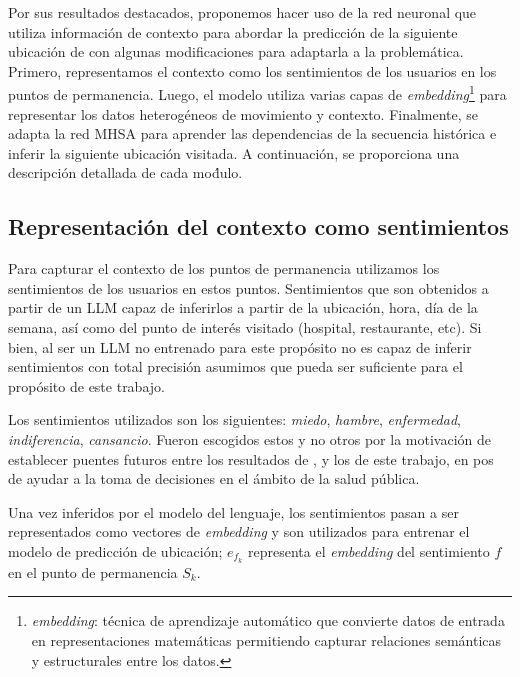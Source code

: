 Por sus resultados destacados, proponemos hacer uso de la red neuronal 
que utiliza información de contexto para 
abordar la predicción de la siguiente ubicación de \cite{Hong_2023}
con algunas modificaciones para adaptarla a la problemática. Primero, representamos el contexto 
como los sentimientos de los usuarios en los puntos de permanencia. 
Luego, el modelo utiliza varias capas de \textit{embedding}\footnote{\textit{embedding}: 
técnica de aprendizaje automático que convierte datos de entrada en
representaciones matem\'aticas permitiendo capturar relaciones
sem\'anticas y estructurales entre los datos.} para representar los 
datos heterogéneos de movimiento y contexto. Finalmente, 
se adapta la red MHSA para aprender las dependencias de la 
secuencia histórica e inferir la siguiente ubicación visitada. 
A continuación, se proporciona una descripción 
detallada de cada mo\'dulo.

\subsection{Representación del contexto como sentimientos}
\label{sec:sents}
Para capturar el contexto de los puntos de permanencia utilizamos 
los sentimientos de los usuarios en estos puntos. Sentimientos que son
obtenidos a partir de un LLM capaz de inferirlos a partir
de la ubicación, hora, d\'ia de la semana, as\'i como del punto de inter\'es
visitado (hospital, restaurante, etc). Si bien, al ser un LLM 
no entrenado para este prop\'osito
no es capaz de inferir sentimientos con total precisión
asumimos que pueda ser suficiente para el prop\'osito de este trabajo.

Los sentimientos utilizados
son los siguientes: \textit{miedo}, \textit{hambre}, 
\textit{enfermedad}, \textit{indiferencia}, \textit{cansancio}. Fueron 
escogidos estos y no otros por la motivaci\'on de establecer puentes futuros 
entre los resultados de \cite{Hernandez2023},
y los de este trabajo, en pos de ayudar a la toma de decisiones
en el \'ambito de la salud p\'ublica.

Una vez inferidos por el modelo del lenguaje, los sentimientos pasan a ser 
representados como vectores de \textit{embedding} y son utilizados
para entrenar el modelo de predicción de ubicación; \(e_{f_k}\) representa
el \textit{embedding} del sentimiento \(f\) en el punto de permanencia \(S_k\).\\

